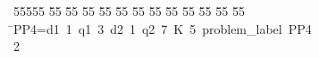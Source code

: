 %
%
\begin{tabbing}
55555 \= 55 \= 55 \= 55 \= 55 \= 55 \= 55 \= 55 \= 55 \= 55 \= 55 \= 55 \= 55 \= \>PP4=d1\ 1\ q1\ 3\ d2\ 1\ q2\ 7\ K\ 5\ problem\_label\ PP4\\[0pt]
2\>\end{tabbing}
